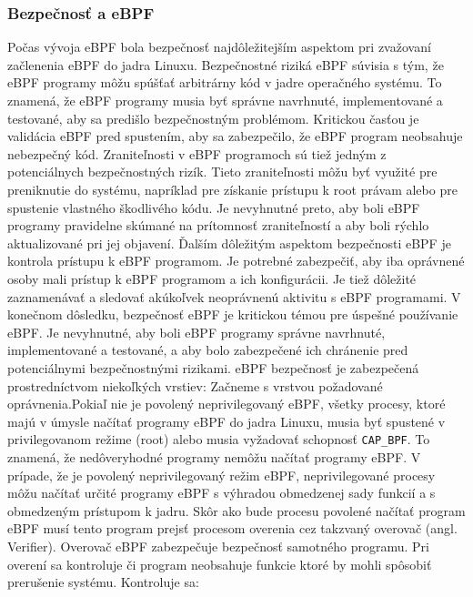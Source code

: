 \subsubsection{Bezpečnosť a eBPF}
Počas vývoja eBPF bola bezpečnosť najdôležitejším aspektom pri zvažovaní začlenenia eBPF do jadra Linuxu. 
Bezpečnostné riziká eBPF súvisia s tým, že eBPF programy môžu spúšťať arbitrárny kód v jadre operačného systému. 
To znamená, že eBPF programy musia byť správne navrhnuté, implementované a testované, aby sa predišlo bezpečnostným problémom. 
Kritickou časťou je validácia eBPF pred spustením, aby sa zabezpečilo, že eBPF program neobsahuje nebezpečný kód. 
Zraniteľnosti v eBPF programoch sú tiež jedným z potenciálnych bezpečnostných rizík. Tieto zraniteľnosti môžu byť využité pre preniknutie do systému, 
napríklad pre získanie prístupu k root právam alebo pre spustenie vlastného škodlivého kódu. Je nevyhnutné preto, 
aby boli eBPF programy pravidelne skúmané na prítomnosť zraniteľností a aby boli rýchlo aktualizované pri jej objavení. 
Ďalším dôležitým aspektom bezpečnosti eBPF je kontrola prístupu k eBPF programom. Je potrebné zabezpečiť, aby iba oprávnené osoby 
mali prístup k eBPF programom a ich konfigurácii. Je tiež dôležité zaznamenávať a sledovať akúkoľvek neoprávnenú aktivitu s eBPF programami. 
V konečnom dôsledku, bezpečnosť eBPF je kritickou témou pre úspešné používanie eBPF. Je nevyhnutné, aby boli eBPF programy 
správne navrhnuté, implementované a testované, a aby bolo zabezpečené ich chránenie pred potenciálnymi bezpečnostnými rizikami.
eBPF bezpečnosť je zabezpečená prostredníctvom niekoľkých vrstiev:
Začneme s vrstvou požadované oprávnenia.Pokiaľ nie je povolený neprivilegovaný eBPF, všetky procesy, ktoré majú v úmysle načítať programy 
eBPF do jadra Linuxu, musia byť spustené v privilegovanom režime (root) alebo musia vyžadovať schopnosť \texttt{CAP\_BPF}. 
To znamená, že nedôveryhodné programy nemôžu načítať programy eBPF. V prípade, že je povolený neprivilegovaný režim eBPF, 
neprivilegované procesy môžu načítať určité programy eBPF s výhradou obmedzenej sady funkcií a s obmedzeným prístupom k jadru. 
Skôr ako bude procesu povolené načítať program eBPF musí tento program prejsť procesom overenia cez takzvaný overovač (angl. Verifier). 
Overovač eBPF zabezpečuje bezpečnosť samotného programu. Pri overení sa kontroluje či program neobsahuje funkcie ktoré by mohli spôsobiť prerušenie systému. 
Kontroluje sa: 
